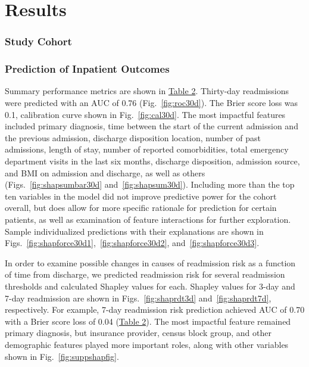 \section{Results}
\subsubsection{Study Cohort}
\sloppy


\subsubsection{Prediction of Inpatient Outcomes}
Summary performance metrics are shown in \hyperref[table:table2]{Table 2}.
Thirty-day readmissions were predicted with an AUC of 0.76 (Fig.\ \ref{fig:roc30d}).\@
The Brier score loss was 0.1, calibration curve shown in Fig.\ \ref{fig:cal30d}.\@
The most impactful features included primary diagnosis, 
time between the start of the current admission and the previous admission,
discharge disposition location, 
number of past admissions, length of stay, number of reported comorbidities,  
total emergency department visits in the last six months,
discharge disposition, admission source, and BMI on admission and discharge, 
as well as others (Figs.\ \ref{fig:shapsumbar30d} and~\ref{fig:shapsum30d}).\@
Including more than the top ten variables in the model did not improve predictive power for the cohort overall, 
but does allow for more specific rationale for prediction for certain patients, as well as 
examination of feature interactions for further exploration.\@
Sample individualized predictions with their explanations are shown in 
Figs.\ \ref{fig:shapforce30d1},~\ref{fig:shapforce30d2}, and~\ref{fig:shapforce30d3}.\@

In order to examine possible changes in causes of readmission risk as a function of time from discharge, 
we predicted readmission risk for several readmission thresholds and calculated Shapley values for each.\@
Shapley values for 3-day and 7-day readmission are shown in Figs.\ \ref{fig:shaprdt3d} and~\ref{fig:shaprdt7d}, respectively.\@
For example, 7-day readmission risk prediction achieved AUC of 0.70 %
with a Brier score loss of 0.04 (\hyperref[table:table2]{Table 2}).\@
The most impactful feature remained primary diagnosis, %
but insurance provider, census block group, and other demographic features played more important roles, %
along with other variables shown in Fig.\ \ref{fig:suppshapfig}.\@

